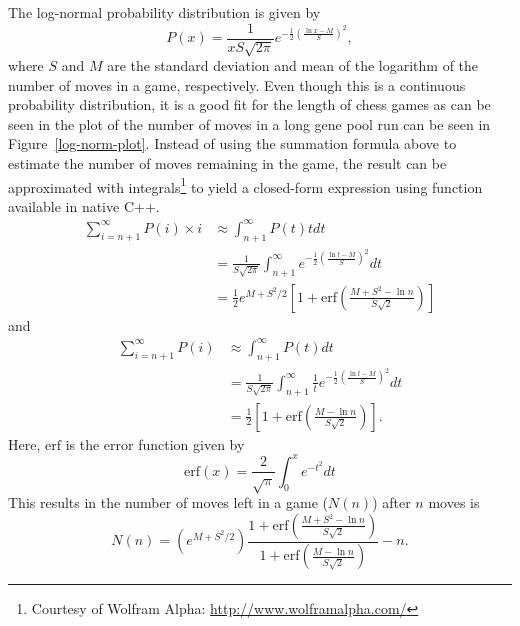 \documentclass[letterpaper]{article}
\newcommand{\cpp}{C{\nobreak+}{\nobreak+}}
\renewcommand{\_}{\allowbreak\textunderscore\allowbreak}
\begin{document}
The log-normal probability distribution is given by
\[P(x) = \frac{1}{xS\sqrt{2\pi}} e^{-\frac{1}{2}{\left(\frac{\ln{x} - M}{S}\right)}^2},\]
where \(S\) and \(M\) are the standard deviation and mean of the logarithm of the number of moves in a game, respectively. Even though this is a continuous probability distribution, it is a good fit for the length of chess games as can be seen in the plot of the number of moves in a long gene pool run can be seen in Figure~\ref{log-norm-plot}. Instead of using the summation formula above to estimate the number of moves remaining in the game, the result can be approximated with integrals\footnote{Courtesy of Wolfram Alpha: \url{http://www.wolframalpha.com/}} to yield a closed-form expression using function available in native \cpp.
\begin{align*}
\sum_{i = n + 1}^\infty P(i)\times{}i &\approx \int_{n+1}^\infty P(t)tdt \\
	&= \frac{1}{S\sqrt{2\pi}} \int_{n+1}^\infty e^{-\frac{1}{2}{\left(\frac{\ln{t} - M}{S}\right)}^2}dt\\
	&= \frac{1}{2}e^{M + S^2/2}{\left[1 + \textrm{erf}{\left(\frac{M + S^2 - \ln n}{S\sqrt{2}}\right)}\right]}
\end{align*}
and
\begin{align*}
\sum_{i = n + 1}^\infty P(i) &\approx \int_{n+1}^\infty P(t)dt \\
	&= \frac{1}{S\sqrt{2\pi}} \int_{n+1}^\infty \frac{1}{t} e^{-\frac{1}{2}{\left(\frac{\ln{t} - M}{S}\right)}^2}dt \\
	&= \frac{1}{2}\left[1 + \textrm{erf}\left(\frac{M-\ln n}{S\sqrt{2}}\right)\right].
\end{align*}
Here, \(\textrm{erf}\) is the error function given by
\[
\textrm{erf}(x) = \frac{2}{\sqrt{\pi}}\int_0^x e^{-t^2}dt
\]
This results in the number of moves left in a game (\(N(n)\)) after \(n\) moves is
\[
N(n) = \left(e^{M + S^2/2}\right) \frac
{1 + \textrm{erf}\left(\frac{M + S^2 - \ln n}{S\sqrt{2}}\right)}
{1 + \textrm{erf}\left(\frac{M-\ln n}{S\sqrt{2}}\right)}
- n.
\]
\end{document}
